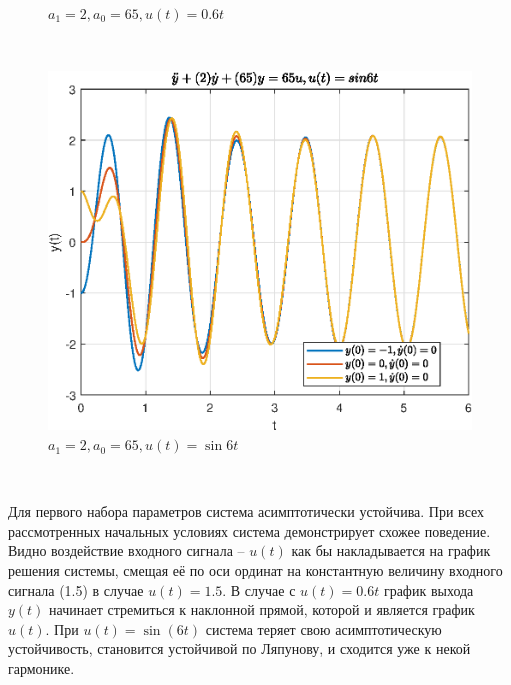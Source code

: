 \documentclass[a4paper]{article}
\begin{document}
\begin{figure}[H]
\begin{minipage}{0.5\textwidth}
        \caption{$a_1 = 2, a_0 = 65, u(t) = 0.6t$}
    \end{minipage}\\[1em]
\end{figure}\noindent\

\begin{figure}[H]
    \centering
    \includegraphics[width=0.6\linewidth]{ex1/sin6t_2_65.eps}
    \caption{$a_1 = 2, a_0 = 65, u(t) = \sin{6t}$}
\end{figure}\

Для первого набора параметров система асимптотически устойчива. При всех рассмотренных начальных условиях система демонстрирует схожее поведение. Видно воздействие входного сигнала -- $u(t)$ как бы накладывается на график решения системы, смещая её по оси ординат на константную величину входного сигнала (1.5) в случае $u(t) = 1.5$. В случае с $u(t) = 0.6t$ график выхода $y(t)$ начинает стремиться к наклонной прямой, которой и является график $u(t)$. При $u(t) = \sin{(6t)}$ система теряет свою асимптотическую устойчивость, становится устойчивой по Ляпунову, и сходится уже к некой гармонике.
\end{document}
